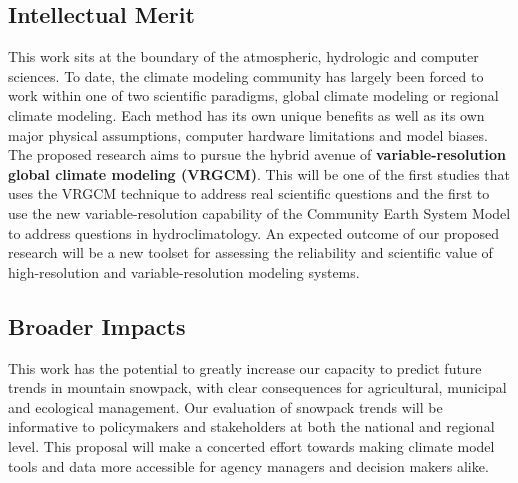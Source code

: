 \documentclass[11pt]{article}
\begin{document}
\vspace{-0.7cm}
\subsection*{Intellectual Merit}
\vspace{-0.5cm}

This work sits at the boundary of the atmospheric, hydrologic and computer sciences.  To date, the climate modeling community has largely been forced to work within one of two scientific paradigms, global climate modeling or regional climate modeling.  Each method has its own unique benefits as well as its own major physical assumptions, computer hardware limitations and model biases.  The proposed research aims to pursue the hybrid avenue of \textbf{variable-resolution global climate modeling (VRGCM)}.  This will be one of the first studies that uses the VRGCM technique to address real scientific questions and the first to use the new variable-resolution capability of the Community Earth System Model to address questions in hydroclimatology.  An expected outcome of our proposed research will be a new toolset for assessing the reliability and scientific value of high-resolution and variable-resolution modeling systems. 


\vspace{-0.7cm}
\subsection*{Broader Impacts}
\vspace{-0.5cm}

This work has the potential to greatly increase our capacity to predict future trends in mountain snowpack, with clear consequences for agricultural, municipal and ecological management.  Our evaluation of snowpack trends will be informative to policymakers and stakeholders at both the national and regional level.  This proposal will make a concerted effort towards making climate model tools and data more accessible for agency managers and decision makers alike.
\end{document}
